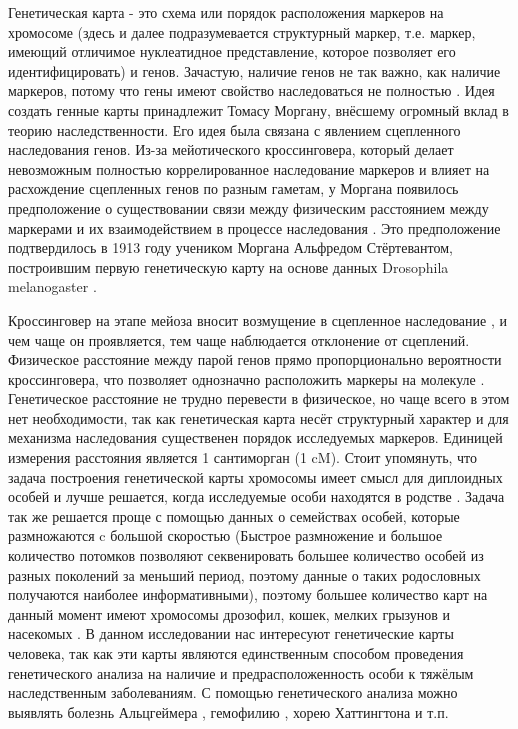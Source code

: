\documentclass{matmex-diploma-custom}
\begin{document}
Генетическая карта - это схема или порядок расположения маркеров на
хромосоме (здесь и далее подразумевается структурный маркер,
т.е. маркер, имеющий отличимое нуклеатидное представление, которое
позволяет его идентифицировать) и генов. Зачастую, наличие генов не
так важно, как наличие маркеров, потому что гены имеют свойство
наследоваться не полностью \cite{schiller2010genome}. Идея создать
генные карты принадлежит Томасу Моргану, внёсшему огромный вклад в
теорию наследственности. Его идея была связана с явлением сцепленного
наследования генов. Из-за мейотического кроссинговера, который делает
невозможным полностью коррелированное наследование маркеров и влияет
на расхождение сцепленных генов по разным гаметам, у Моргана появилось
предположение о существовании связи между физическим расстоянием между
маркерами и их взаимодействием в процессе наследования
\cite{creighton1931correlation}. Это предположение подтвердилось в
1913 году учеником Моргана Альфредом Стёртевантом, построившим первую
генетическую карту на основе данных Drosophila melanogaster
\cite{goldhor1962genetics,sturtevant1939introduction}.

Кроссинговер на этапе мейоза вносит возмущение в сцепленное
наследование \cite{creighton1931correlation}, и чем чаще он
проявляется, тем чаще наблюдается отклонение от сцеплений. Физическое
расстояние между парой генов прямо пропорционально вероятности
кроссинговера, что позволяет однозначно расположить маркеры на
молекуле \cite{sturtevant1939introduction}. Генетическое расстояние не
трудно перевести в физическое, но чаще всего в этом нет необходимости,
так как генетическая карта несёт структурный характер и для механизма
наследования существенен порядок \cite{hartl2011genetics,
  malacinski2005essentials} исследуемых маркеров. Единицей измерения
расстояния является 1 сантиморган (1 cM). Стоит упомянуть, что задача
построения генетической карты хромосомы имеет смысл для диплоидных
особей и лучше решается, когда исследуемые особи находятся в родстве
\cite{meiosi}. Задача так же решается проще с помощью данных о
семействах особей, которые размножаются c большой скоростью (Быстрое
размножение и большое количество потомков позволяют секвенировать
большее количество особей из разных поколений за меньший период,
поэтому данные о таких родословных получаются наиболее
информативными), поэтому большее количество карт на данный момент
имеют хромосомы дрозофил, кошек, мелких грызунов и насекомых
\cite{mcpeek1996introduction}. В данном исследовании нас интересуют
генетические карты человека, так как эти карты являются единственным
способом проведения генетического анализа на наличие и
предрасположенность особи к тяжёлым наследственным заболеваниям. С
помощью генетического анализа можно выявлять болезнь Альцгеймера
\cite{schellenberg1992genetic}, гемофилию \cite{oberle1985genetic},
хорею Хаттингтона \cite{anderson2004polymorphic} и т.п.
\end{document}
